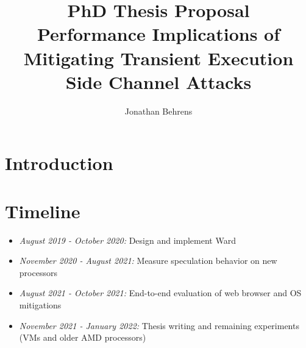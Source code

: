 \documentclass[letterpaper,12pt]{article}
\begin{document}

\date{\vspace{-\baselineskip}}
\title{\bf PhD Thesis Proposal \\ \large Performance Implications of Mitigating Transient Execution Side Channel Attacks}
\author{ {\rm Jonathan Behrens} }
\maketitle

\section{Introduction}


\section{Timeline}
\begin{itemize}
\item\textit{August 2019 - October 2020:} Design and implement Ward
\item\textit{November 2020 - August 2021:} Measure speculation behavior on new processors
\item\textit{August 2021 - October 2021:} End-to-end evaluation of web browser and OS mitigations
\item\textit{November 2021 - January 2022:} Thesis writing and remaining experiments (VMs and older AMD processors)
\end{itemize}

\pagebreak
{}

\end{document}
